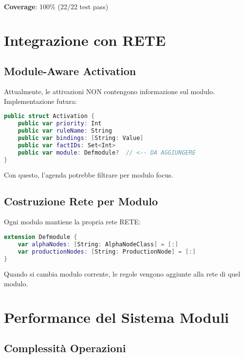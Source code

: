 \textbf{Coverage}: 100\% (22/22 test pass)

\section{Integrazione con RETE}

\subsection{Module-Aware Activation}

\begin{osservazione}
Attualmente, le attivazioni NON contengono informazione sul modulo. Implementazione futura:

\begin{lstlisting}[language=Swift]
public struct Activation {
    public var priority: Int
    public var ruleName: String
    public var bindings: [String: Value]
    public var factIDs: Set<Int>
    public var module: Defmodule?  // <-- DA AGGIUNGERE
}
\end{lstlisting}

Con questo, l'agenda potrebbe filtrare per modulo focus.
\end{osservazione}

\subsection{Costruzione Rete per Modulo}

Ogni modulo mantiene la propria rete RETE:

\begin{lstlisting}[language=Swift]
extension Defmodule {
    var alphaNodes: [String: AlphaNodeClass] = [:]
    var productionNodes: [String: ProductionNode] = [:]
}
\end{lstlisting}

Quando si cambia modulo corrente, le regole vengono aggiunte alla rete di quel modulo.

\section{Performance del Sistema Moduli}

\subsection{Complessità Operazioni}

